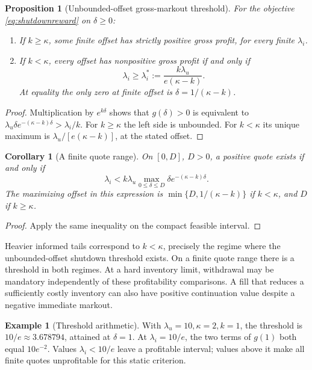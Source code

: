 \documentclass[11pt]{article}
\theoremstyle{plain}
\newtheorem{proposition}[theorem]{Proposition}
\newtheorem{corollary}[theorem]{Corollary}
\theoremstyle{definition}
\newtheorem{example}[theorem]{Example}
\theoremstyle{remark}
\begin{document}
\begin{proposition}[Unbounded-offset gross-markout threshold]\label{thm:shutdown}
For the objective \eqref{eq:shutdownreward} on \(\delta\ge0\):
\begin{enumerate}
\item If \(k\ge\kappa\), some finite offset has strictly positive
gross profit, for every finite \(\lambda_i\).
\item If \(k<\kappa\), every offset has nonpositive gross profit if and
only if
\[
\lambda_i\ge\lambda_i^\ast:=
\frac{k\lambda_u}{e(\kappa-k)}.
\]
At equality the only zero at finite offset is
\(\delta=1/(\kappa-k)\).
\end{enumerate}
\end{proposition}
\begin{proof}
Multiplication by \(e^{k\delta}\) shows that \(g(\delta)>0\) is equivalent
to
\(\lambda_u\delta e^{-(\kappa-k)\delta}>\lambda_i/k\).
For \(k\ge\kappa\) the left side is unbounded. For \(k<\kappa\) its
unique maximum is \(\lambda_u/[e(\kappa-k)]\), at the stated offset.
\end{proof}

\begin{corollary}[A finite quote range]\label{cor:finitequote}
On \([0,D]\), \(D>0\), a positive quote exists if and only if
\[
\lambda_i<
k\lambda_u\max_{0\le\delta\le D}
\delta e^{-(\kappa-k)\delta}.
\]
The maximizing offset in this expression is
\(\min\{D,1/(\kappa-k)\}\) if \(k<\kappa\), and \(D\) if
\(k\ge\kappa\).
\end{corollary}
\begin{proof}
Apply the same inequality on the compact feasible interval.
\end{proof}

Heavier informed tails correspond to \(k<\kappa\), precisely the regime
where the unbounded-offset shutdown threshold exists. On a finite quote
range there is a threshold in both regimes. At a hard inventory limit,
withdrawal may be mandatory independently of these profitability
comparisons. A fill that reduces a sufficiently costly inventory can also
have positive continuation value despite a negative immediate markout.

\begin{example}[Threshold arithmetic]\label{ex:shutdown}
With \(\lambda_u=10,\kappa=2,k=1\), the threshold is
\(10/e\approx3.678794\), attained at \(\delta=1\).
At \(\lambda_i=10/e\), the two terms of \(g(1)\) both equal
\(10e^{-2}\). Values \(\lambda_i<10/e\) leave a profitable interval;
values above it make all finite quotes unprofitable for this static
criterion.
\end{example}
\end{document}
